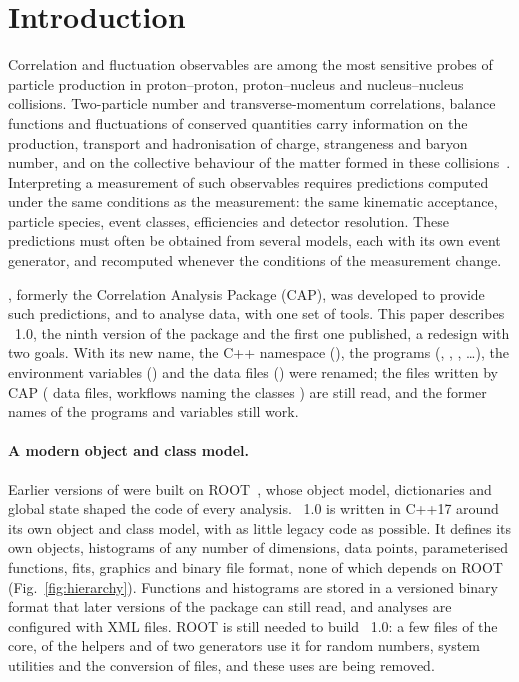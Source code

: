 \section{Introduction}
\label{sec:introduction}

Correlation and fluctuation observables are among the most sensitive probes of particle production in
proton--proton, proton--nucleus and nucleus--nucleus collisions. Two-particle number and transverse-momentum
correlations, balance functions and fluctuations of conserved quantities carry information on the production,
transport and hadronisation of charge, strangeness and baryon number, and on the collective behaviour of the matter
formed in these collisions~\cite{Pruneau:2002yf,Sharma:2008qr,Gavin:2006xd,Bass:2000az}. Interpreting a measurement
of such observables requires predictions computed under the same conditions as the measurement: the same kinematic
acceptance, particle species, event classes, efficiencies and detector resolution. These predictions must often be
obtained from several models, each with its own event generator, and recomputed whenever the conditions of the
measurement change.

\Datum{}, formerly the Correlation Analysis Package (CAP), was developed to provide such predictions, and to analyse
data, with one set of tools. This paper describes \Datum{}~1.0, the ninth version of the package and the first one
published, a redesign with two goals. With its new name, the C++ namespace (), the programs
(, , , \ldots), the environment variables () and
the data files () were renamed; the files written by CAP ( data files, workflows naming the
classes ) are still read, and the former names of the programs and variables still work.

\paragraph{A modern object and class model.}
Earlier versions of \Datum{} were built on ROOT~\cite{Brun:1997pa}, whose object model, dictionaries and global state
shaped the code of every analysis. \Datum{}~1.0 is written in C++17 around its own object and class model, with as little
legacy code as possible. It defines its own objects, histograms of any number of dimensions, data points, parameterised
functions, fits, graphics and binary file format, none of which depends on ROOT (Fig.~\ref{fig:hierarchy}). Functions
and histograms are stored in a versioned binary format that later versions of the package can still read, and
analyses are configured with XML files. {\color{red}ROOT is still needed to build \Datum{}~1.0: a few files of the core, of the
helpers and of two generators use it for random numbers, system utilities and the conversion of  files,
and these uses are being removed.}

